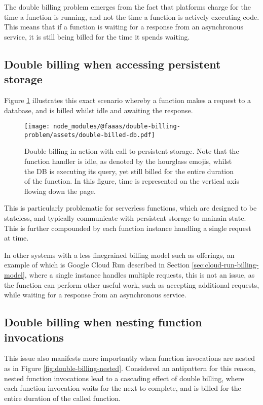 The double billing problem emerges from the fact that \faas{} platforms charge for the time a function is running, and not the time a function is actively executing code. This means that if a function is waiting for a response from an asynchronous service, it is still being billed for the time it spends waiting.

\subsection{Double billing when accessing persistent storage}
Figure \ref{fig:double-billing-db} illustrates this exact scenario whereby a function makes a request to a database, and is billed whilst idle and awaiting the response.

\begin{figure}[t]
    \centering\texttt{[image: node\_modules/@faaas/double-billing-problem/assets/double-billed-db.pdf]}
    \caption{Double billing in action with call to persistent storage. Note that the function handler is idle, as denoted by the hourglass emojis, whilst the DB is executing its query, yet still billed for the entire duration of the function. In this figure, time is represented on the vertical axis flowing down the page.}
    \label{fig:double-billing-db}
\end{figure}

This is particularly problematic for serverless functions, which are designed to be stateless, and typically communicate with persistent storage to mainain state. This is further compounded by each function instance handling a single request at time.

In other systems with a less finegrained billing model such as \caas{} offerings, an example of which is Google Cloud Run described in Section \ref{sec:cloud-run-billing-model}, where a single instance handles multiple requests, this is not an issue, as the function can perform other useful work, such as accepting additional requests, while waiting for a response from an asynchronous service.

\subsection{Double billing when nesting function invocations}
This issue also manifests more importantly when function invocations are nested as in Figure \ref{fig:double-billing-nested}. Considered an antipattern for this reason\cite{LambdaFunctionsCalling}, nested function invocations lead to a cascading effect of double billing, where each function invocation waits for the next to complete, and is billed for the entire duration of the called function.

